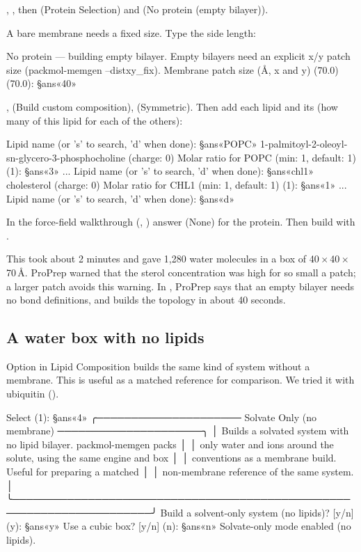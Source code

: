 \begin{steps}
  \item {}, , then  (\textsf{Protein Selection}) and
         (\textsf{No protein (empty bilayer)}).
  \item A bare membrane needs a fixed size. Type the side length:
\begin{screen}
No protein — building empty bilayer.
Empty bilayers need an explicit x/y patch size (packmol-memgen --distxy_fix).
Membrane patch size (Å, x and y) (70.0) (70.0): §ans«40»
\end{screen}
  \item {},  (\textsf{Build custom composition}), 
        (\textsf{Symmetric}). Then add each lipid and its 
        (how many of this lipid for each of the others):
\begin{screen}
  Lipid name (or 's' to search, 'd' when done): §ans«POPC»
  1-palmitoyl-2-oleoyl-sn-glycero-3-phosphocholine (charge: 0)
  Molar ratio for POPC (min: 1, default: 1) (1): §ans«3»
...
  Lipid name (or 's' to search, 'd' when done): §ans«chl1»
  cholesterol (charge: 0)
  Molar ratio for CHL1 (min: 1, default: 1) (1): §ans«1»
...
  Lipid name (or 's' to search, 'd' when done): §ans«d»
\end{screen}
  \item In the force-field walkthrough (, ) answer 
        (None) for the protein. Then build with .
\end{steps}

This took about 2 minutes and gave 1,280 water molecules in a box of
40\,$\times$\,40\,$\times$\,70\,\AA. ProPrep warned that the sterol
concentration was high for so small a patch; a larger patch avoids this
warning. In , ProPrep says that an empty bilayer needs no bond
definitions, and builds the topology in about 40 seconds.

\subsection{A water box with no lipids}

Option  in \textsf{Lipid Composition} builds the same kind of system
without a membrane. This is useful as a matched reference for comparison. We
tried it with ubiquitin ().

\begin{screen}
Select (1): §ans«4»
╭───────────────────── Solvate Only (no membrane) ─────────────────────╮
│ Builds a solvated system with no lipid bilayer. packmol-memgen packs │
│ only water and ions around the solute, using the same engine and box │
│ conventions as a membrane build. Useful for preparing a matched      │
│ non-membrane reference of the same system.                           │
╰──────────────────────────────────────────────────────────────────────╯
Build a solvent-only system (no lipids)? [y/n] (y): §ans«y»
Use a cubic box? [y/n] (n): §ans«n»
Solvate-only mode enabled (no lipids).
\end{screen}

